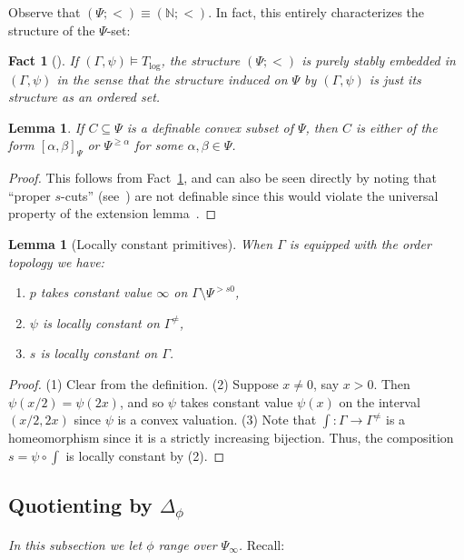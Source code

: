 \documentclass[11pt]{amsart}
\theoremstyle{plain}
\newtheorem{lemma}[thm]{Lemma}
\newtheorem{fact}[thm]{Fact}
\theoremstyle{definition}
\numberwithin{equation}{section}
\newcommand\N{\mathbb{N}}
\newcommand\0{\varnothing}
\begin{document}
\noindent
Observe that $(\Psi;<)\equiv(\N;<)$. In fact, this entirely characterizes the structure of the $\Psi$-set:

\begin{fact}[{\cite[Corollary~7.2]{GehretACTlog}}]\label{fact_Psistabembed}
If $(\Gamma,\psi)\models T_{\log}$, the structure $(\Psi;<)$ is purely stably embedded in $(\Gamma,\psi)$ in the sense that the structure induced on $\Psi$ by $(\Gamma,\psi)$ is just its structure as an ordered set.
\end{fact}


\begin{lemma}\label{definable_subset_Psi_set_fact}
If $C\subseteq\Psi$ is a definable convex subset of $\Psi$, then $C$ is either of the form $[\alpha,\beta]_{\Psi}$ or $\Psi^{\geq\alpha}$ for some $\alpha,\beta\in\Psi$.
\end{lemma}
\begin{proof}
This follows from Fact~\ref{fact_Psistabembed}, and can also be seen directly by noting that ``proper $s$-cuts'' (see~\cite[2.7]{GehretACTlogNIP}) are not definable since this would violate the universal property of the extension lemma~\cite[4.12]{GehretACTlog}.
\end{proof}

\begin{lemma}[Locally constant primitives]\label{loc_const_primitives}
When $\Gamma$ is equipped with the order topology we have:
\begin{enumerate}
\item $p$ takes constant value $\infty$ on $\Gamma\setminus\Psi^{>s0}$,
\item $\psi$ is locally constant on $\Gamma^{\neq}$,
\item $s$ is locally constant on $\Gamma$.
\end{enumerate}
\end{lemma}
\begin{proof}
(1) Clear from the definition. (2) Suppose $x\neq 0$, say $x>0$. Then $\psi(x/2)=\psi(2x)$, and so $\psi$ takes constant value $\psi(x)$ on the interval $(x/2,2x)$ since $\psi$ is a convex valuation. (3) Note that $\int\colon\Gamma\to\Gamma^{\neq}$ is a homeomorphism since it is a strictly increasing bijection. Thus, the composition $s=\psi\circ\int$ is locally constant by (2).
\end{proof}

\subsection{Quotienting by \texorpdfstring{$\Delta_{\phi}$}{∆ᵩ}}\label{subsec_quotienting}
\emph{In this subsection we let $\phi$ range over $\Psi_{\infty}$.} Recall:
\end{document}
